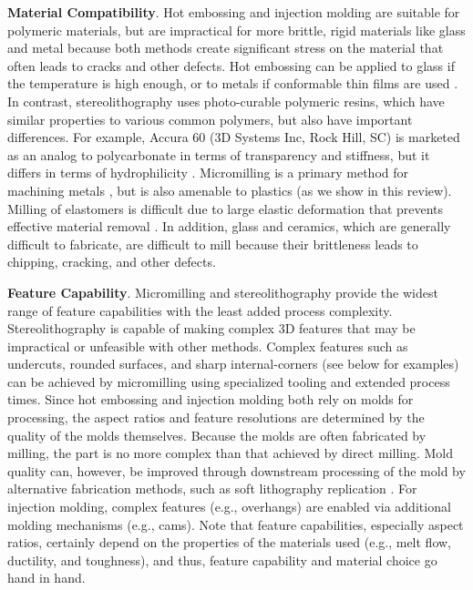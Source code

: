 \textbf{Material Compatibility}. Hot embossing and injection molding are suitable for polymeric materials, but are impractical for more brittle, rigid materials like glass and metal because both methods create significant stress on the material that often leads to cracks and other defects. Hot embossing can be applied to glass if the temperature is high enough, or to metals if conformable thin films are used \cite{Kumar2009, Rabe2007}. In contrast, stereolithography uses photo-curable polymeric resins, which have similar properties to various common polymers, but also have important differences. For example, Accura 60 (3D Systems Inc, Rock Hill, SC) is marketed as an analog to polycarbonate in terms of transparency and stiffness, but it differs in terms of hydrophilicity \cite{Waldbaur2011}. Micromilling is a primary method for machining metals \cite{Childs2000}, but is also amenable to plastics (as we show in this review). Milling of elastomers is difficult due to large elastic deformation that prevents effective material removal \cite{Shih2004}. In addition, glass and ceramics, which are generally difficult to fabricate, are difficult to mill because their brittleness leads to chipping, cracking, and other defects.

\textbf{Feature Capability}. Micromilling and stereolithography provide the widest range of feature capabilities with the least added process complexity. Stereolithography is capable of making complex 3D features that may be impractical or unfeasible with other methods. Complex features such as undercuts, rounded surfaces, and sharp internal-corners (see below for examples) can be achieved by micromilling using specialized tooling and extended process times. Since hot embossing and injection molding both rely on molds for processing, the aspect ratios and feature resolutions are determined by the quality of the molds themselves. Because the molds are often fabricated by milling, the part is no more complex than that achieved by direct milling. Mold quality can, however, be improved through downstream processing of the mold by alternative fabrication methods, such as soft lithography replication \cite{Young2011}. For injection molding, complex features (e.g., overhangs) are enabled via additional molding mechanisms (e.g., cams). Note that feature capabilities, especially aspect ratios, certainly depend on the properties of the materials used (e.g., melt flow, ductility, and toughness), and thus, feature capability and material choice go hand in hand. 

